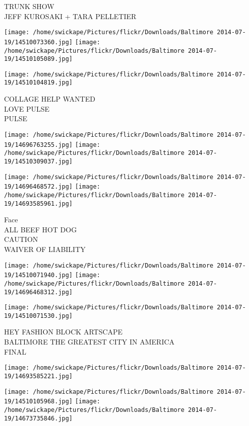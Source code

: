 \documentclass[10pt,letterpaper]{article}
\begin{document}
TRUNK SHOW\\
JEFF KUROSAKI + TARA PELLETIER
\pagebreak

\texttt{[image: /home/swickape/Pictures/flickr/Downloads/Baltimore 2014-07-19/14510073360.jpg]}
\texttt{[image: /home/swickape/Pictures/flickr/Downloads/Baltimore 2014-07-19/14510105089.jpg]}

\vspace{0.25in}
\texttt{[image: /home/swickape/Pictures/flickr/Downloads/Baltimore 2014-07-19/14510104819.jpg]}

COLLAGE HELP WANTED\\
LOVE PULSE\\
PULSE
\pagebreak

\texttt{[image: /home/swickape/Pictures/flickr/Downloads/Baltimore 2014-07-19/14696763255.jpg]}
\texttt{[image: /home/swickape/Pictures/flickr/Downloads/Baltimore 2014-07-19/14510309037.jpg]}

\texttt{[image: /home/swickape/Pictures/flickr/Downloads/Baltimore 2014-07-19/14696468572.jpg]}
\texttt{[image: /home/swickape/Pictures/flickr/Downloads/Baltimore 2014-07-19/14693585961.jpg]}

Face\\
ALL BEEF HOT DOG\\
CAUTION\\
WAIVER OF LIABILITY
\pagebreak

\texttt{[image: /home/swickape/Pictures/flickr/Downloads/Baltimore 2014-07-19/14510071940.jpg]}
\texttt{[image: /home/swickape/Pictures/flickr/Downloads/Baltimore 2014-07-19/14696468312.jpg]}

\texttt{[image: /home/swickape/Pictures/flickr/Downloads/Baltimore 2014-07-19/14510071530.jpg]}

HEY FASHION BLOCK ARTSCAPE\\
BALTIMORE THE GREATEST CITY IN AMERICA\\
FINAL
\pagebreak

\texttt{[image: /home/swickape/Pictures/flickr/Downloads/Baltimore 2014-07-19/14693585221.jpg]}

\vspace{0.25in}
\texttt{[image: /home/swickape/Pictures/flickr/Downloads/Baltimore 2014-07-19/14510105968.jpg]}
\texttt{[image: /home/swickape/Pictures/flickr/Downloads/Baltimore 2014-07-19/14673735846.jpg]}
\end{document}
